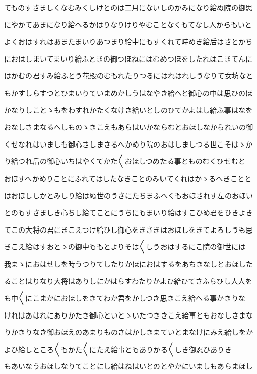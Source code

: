\documentclass[a4paper,11pt,landscape]{ltjtarticle}
\begin{document}
てものすさましくなむみくしけとのは二月にないしのかみになり給ぬ院の御思
\par\medskip
にやかてあまになり給へるかはりなりけりやむことなくもてなし人からもいと
\par\medskip
よくおはすれはあまたまいりあつまり給中にもすくれて時めき給后はさとかち
\par\medskip
におはしまいてまいり給ふときの御つほねにはむめつほをしたれはこきてんに
\par\medskip
はかむの君すみ給ふとう花殿のむもれたりつるにはれはれしうなりて女坊なと
\par\medskip
もかすしらすつとひまいりていまめかしうはなやき給へと御心の中は思ひのほ
\par\medskip
かなりしことゝもをわすれかたくなけき給いとしのひてかよはし給ふ事はなを
\par\medskip
おなしさまなるへしものゝきこえもあらはいかならむとおほしなかられいの御
\par\medskip
くせなれはいましも御心さしまさるへかめり院のおはしましつる世こそはゝか
\par\medskip
り給つれ后の御心いちはやくてかた〱おほしつめたる事とものむくひせむと
\par\medskip
おほすへかめりことにふれてはしたなきことのみいてくれはかゝるへきことと
\par\medskip
はおほししかとみしり給はぬ世のうさにたちまふへくもおほされす左のおほい
\par\medskip
とのもすさましき心ちし給てことにうちにもまいり給はすこひめ君をひきよき
\par\medskip
てこの大将の君にきこえつけ給ひし御心をきさきはおほしをきてよろしうも思
\par\medskip
きこえ給はすおとゝの御中ももとよりそは〱しうおはするにこ院の御世には
\par\medskip
我まゝにおはせしを時うつりてしたりかほにおはするをあちきなしとおほした
\par\medskip
ることはりなり大将はありしにかはらすわたりかよひ給ひてさふらひし人人を
\par\medskip
も中〱にこまかにおほしをきてわか君をかしつき思きこえ給へる事かきりな
\par\medskip
けれはあはれにありかたき御心といとゝいたつききこえ給事ともおなしさまな
\par\medskip
りかきりなき御おほえのあまりものさはかしきまていとまなけにみえ給しをか
\par\medskip
よひ給しところ〱もかた〱にたえ給事ともありかる〱しき御忍ひありき
\par\medskip
もあいなうおほしなりてことにし給はねはいとのとやかにいましもあらまほし
\end{document}
